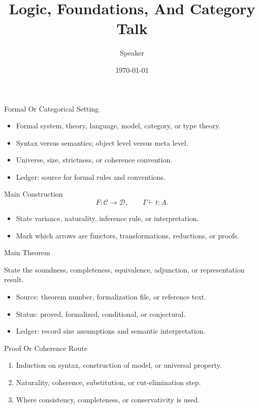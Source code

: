 \documentclass[10pt,aspectratio=169]{beamer}
\title{Logic, Foundations, And Category Talk}
\author{Speaker}
\date{\today}
\begin{document}
\begin{frame}\titlepage\end{frame}

\begin{frame}{Formal Or Categorical Setting}
  \begin{itemize}
    \item Formal system, theory, language, model, category, or type theory.
    \item Syntax versus semantics; object level versus meta level.
    \item Universe, size, strictness, or coherence convention.
    \item Ledger: source for formal rules and conventions.
  \end{itemize}
\end{frame}

\begin{frame}{Main Construction}
  \[
    F : \mathcal{C} \longrightarrow \mathcal{D},
    \qquad
    \Gamma \vdash t : A .
  \]
  \begin{itemize}
    \item State variance, naturality, inference rule, or interpretation.
    \item Mark which arrows are functors, transformations, reductions, or proofs.
  \end{itemize}
\end{frame}

\begin{frame}{Main Theorem}
  \begin{theorem}
    State the soundness, completeness, equivalence, adjunction, or representation result.
  \end{theorem}
  \begin{itemize}
    \item Source: theorem number, formalization file, or reference text.
    \item Status: proved, formalized, conditional, or conjectural.
    \item Ledger: record size assumptions and semantic interpretation.
  \end{itemize}
\end{frame}

\begin{frame}{Proof Or Coherence Route}
  \begin{enumerate}
    \item Induction on syntax, construction of model, or universal property.
    \item Naturality, coherence, substitution, or cut-elimination step.
    \item Where consistency, completeness, or conservativity is used.
  \end{enumerate}
\end{frame}
\end{document}
